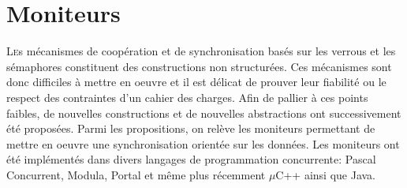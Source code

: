 \chapter{Moniteurs}
\startchapter
\lettrine[lines=4]{L}es mécanismes de coopération et de synchronisation basés sur les verrous et les sémaphores constituent des constructions non structurées. Ces mécanismes sont donc difficiles à mettre en oeuvre et il est délicat de prouver leur fiabilité ou le respect des contraintes d'un cahier des charges. Afin de pallier à ces points faibles, de nouvelles constructions et de nouvelles abstractions ont successivement été proposées. Parmi les propositions, on relève les moniteurs permettant de mettre en oeuvre une synchronisation orientée sur les données. Les moniteurs ont été implémentés dans divers langages de programmation concurrente: Pascal Concurrent, Modula, Portal et même plus récemment $\mu$C++ ainsi que Java.
